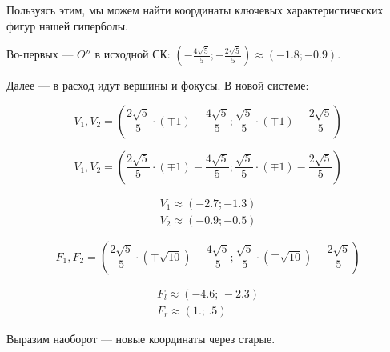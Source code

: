 \documentclass[12pt, a4paper]{article}
\begin{document}
    Пользуясь этим, мы можем найти координаты ключевых характеристических фигур нашей гиперболы.

    Во-первых — $O''$ в исходной СК: $\left( -\frac{4 \sqrt{5}}{5}; -\frac{2 \sqrt{5}}{5} \right) \approx (-1.8; -0.9)$.

    Далее — в расход идут вершины и фокусы. В новой системе:
    
    \begin{equation}
        V_1, V_2 =
            \left(
                \frac{2 \sqrt{5}}{5} \cdot (\mp 1) - \frac{4 \sqrt{5}}{5};
                \frac{\sqrt{5}}{5} \cdot (\mp 1) - \frac{2 \sqrt{5}}{5} 
            \right)
    \end{equation}

    \begin{equation}
        V_1, V_2 =
            \left(
                \frac{2 \sqrt{5}}{5} \cdot (\mp 1) - \frac{4 \sqrt{5}}{5};
                \frac{\sqrt{5}}{5} \cdot (\mp 1) - \frac{2 \sqrt{5}}{5} 
            \right)
    \end{equation}

    \begin{gather}
        V_1 \approx
            \left(
                -2.7; -1.3 
            \right) \\
        V_2 \approx
        \left(
            -0.9; -0.5
        \right)
    \end{gather}
     

    \begin{equation}
        F_1, F_2 =
            \left(
                \frac{2 \sqrt{5}}{5} \cdot (\mp \sqrt{10}) - \frac{4 \sqrt{5}}{5};
                \frac{\sqrt{5}}{5} \cdot (\mp \sqrt{10}) - \frac{2 \sqrt{5}}{5} 
            \right)
    \end{equation}

    \begin{gather}
        F_l \approx \left(
                -4.6; \,
                -2.3
            \right) \\
        F_r \approx \left(
            1.; \,
            .5
        \right)
    \end{gather}

    Выразим наоборот — новые координаты через старые.
\end{document}
